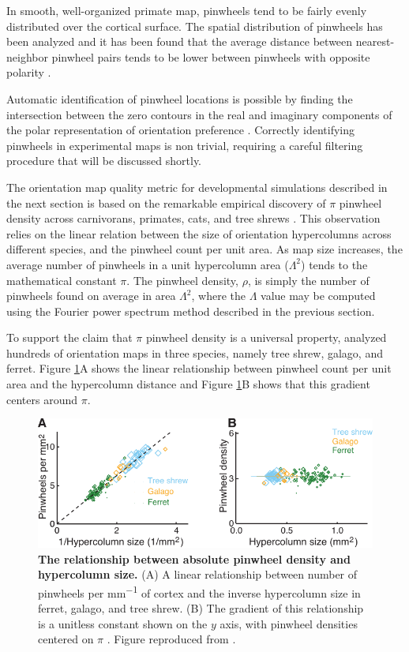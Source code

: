 \documentclass[phd,ianc,twoside]{infthesis}
\begin{document}
In smooth, well-organized primate map, pinwheels tend to be fairly
evenly distributed over the cortical surface. The spatial distribution
of pinwheels has been analyzed and it has been found that the average
distance between nearest-neighbor pinwheel pairs tends to be lower
between pinwheels with opposite polarity \citep{muller_nc00}.

Automatic identification of pinwheel locations is possible by finding
the intersection between the zero contours in the real and imaginary
components of the polar representation of orientation preference
\citep{lowel_ejn98}. Correctly identifying pinwheels in experimental
maps is non trivial, requiring a careful filtering procedure that will
be discussed shortly.

The orientation map quality metric for developmental simulations
described in the next section is based on the remarkable empirical
discovery of $\pi$ pinwheel density across carnivorans, primates, cats,
and tree shrews \citep{keil_science12,kaschube_science10}. This
observation relies on the linear relation between the size of
orientation hypercolumns across different species, and the pinwheel count
per unit area. As map size increases, the average
number of pinwheels in a unit hypercolumn area ($\Lambda^2$) tends to the
mathematical constant $\pi$. The pinwheel density, $\rho$, is simply the
number of pinwheels found on average in area $\Lambda^2$, where the
$\Lambda$ value may be computed using the Fourier power spectrum method
described in the previous section.

To support the claim that $\pi$ pinwheel density is a universal
property, \citet{kaschube_science10} analyzed hundreds of orientation
maps in three species, namely tree shrew, galago, and ferret. Figure
\ref{fig:kaschube_pi_density}A shows the linear relationship between
pinwheel count per unit area and the hypercolumn distance and Figure
\ref{fig:kaschube_pi_density}B shows that this gradient centers around
$\pi$.

\begin{figure}
\centerline{
\includegraphics[scale=1]{./figures/kaschube_pi_density.pdf}
}
\caption[]{{\bf The relationship between absolute pinwheel density and
    hypercolumn size.} (A) A linear relationship between number of
  pinwheels per \si{\mm^{-1}} of cortex and the inverse hypercolumn size in
  ferret, galago, and tree shrew. (B) The gradient of this relationship
  is a unitless constant shown on the $y$ axis, with pinwheel densities
  centered on $\pi$ .  Figure reproduced from
  \citet{kaschube_science10}.}
\label{fig:kaschube_pi_density}
\end{figure}
\end{document}
